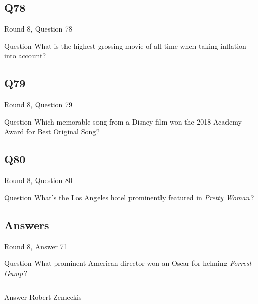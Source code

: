 \documentclass[11pt]{beamer}
\begin{document}
\subsection*{Q78}
\begin{frame}[t]{Round 8, Question 78}
\vspace{2em}
\begin{block}{Question}
What is the highest-grossing movie of all time when taking inflation into account?
\end{block}
\end{frame}
    

\subsection*{Q79}
\begin{frame}[t]{Round 8, Question 79}
\vspace{2em}
\begin{block}{Question}
Which memorable song from a Disney film won the 2018 Academy Award for Best Original Song?
\end{block}
\end{frame}
    

\subsection*{Q80}
\begin{frame}[t]{Round 8, Question 80}
\vspace{2em}
\begin{block}{Question}
What's the Los Angeles hotel prominently featured in \emph{Pretty Woman}\,?
\end{block}
\end{frame}
    
\subsection{Answers}

\begin{frame}[t]{Round 8, Answer 71}
\vspace{2em}
\begin{block}{Question}
What prominent American director won an Oscar for helming \emph{Forrest Gump}\,?
\end{block}
\pause{}
\begin{columns}[T,totalwidth=\linewidth]
\begin{column}{0.35\linewidth}
\begin{block}{Answer}
Robert Zemeckis
\end{block}
\end{column}
\begin{column}{0.6\linewidth}
\begin{center}
\texttt{[image: \{Images/gump]}.jpeg}
\end{center}
\end{column}
\end{columns}
\end{frame}
    
\end{document}
